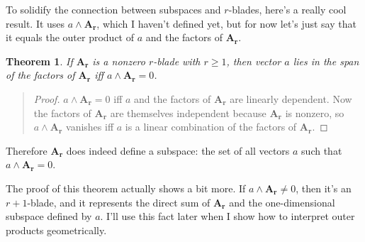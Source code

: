 \documentclass{utarticle}
\newcommand{\bl}[1]{\ensuremath{\bm{#1}}}
\DeclareMathOperator{\out}{\wedge}
\newtheorem{thm}{Theorem}
\newcommand{\bp}{\begin{quotation} \begin{proof}}
\newcommand{\ep}{\end{proof} \end{quotation}}
\begin{document}
To solidify the connection between subspaces and $r$-blades, here's a really
cool result.  It uses $a \out \bl{A_r}$, which I  haven't defined yet, but for now let's 
just say that it equals the outer product of $a$ and the factors of \bl{A_r}.
\begin{thm}
If \bl{A_r} is a nonzero $r$-blade with $r \geq 1$, then vector $a$ lies in the 
span of the factors of \bl{A_r} iff $a \out \bl{A_r} = 0$.  
\label{Aissubspace}
\end{thm}
\bp
$a \out \bl{A_r} =  0$ iff $a$ and the factors of \bl{A_r} are linearly dependent.  
Now the factors of \bl{A_r} are themselves independent because \bl{A_r} is nonzero, 
so $a \out \bl{A_r}$ vanishes iff $a$ is a linear combination of the factors of \bl{A_r}.  
\ep
Therefore \bl{A_r} does indeed define a subspace: the set of all vectors $a$ such that
$a \out \bl{A_r} = 0$.  

The proof of this theorem actually shows a bit more.  If $a \out \bl{A_r} \neq 0$, then it's
an $r+1$-blade, and it represents the direct sum of \bl{A_r} and the one-dimensional 
subspace defined by $a$.  I'll use this fact later when I show how to interpret outer products
geometrically. 
\end{document}
